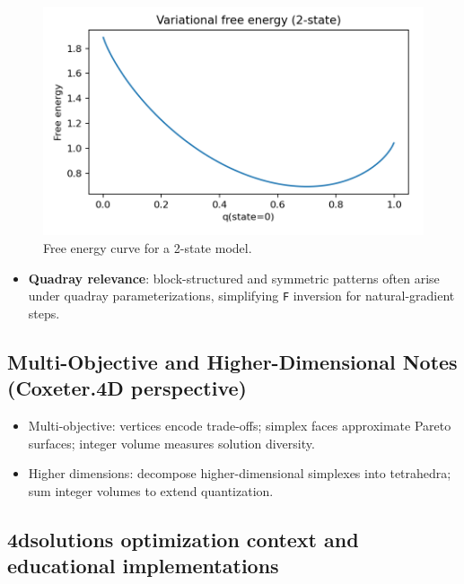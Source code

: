 \documentclass[
]{article}
\providecommand{\tightlist}{%
  \setlength{\itemsep}{0pt}\setlength{\parskip}{0pt}}
\begin{document}
\begin{figure}
\hypertarget{fig:free_energy_curve}{%
\centering
\includegraphics{../output/free_energy_curve.png}
\caption{Free energy curve for a 2-state
model.}\label{fig:free_energy_curve}
}
\end{figure}

\begin{itemize}
\tightlist
\item
  \textbf{Quadray relevance}: block-structured and symmetric patterns
  often arise under quadray parameterizations, simplifying \texttt{F}
  inversion for natural-gradient steps.
\end{itemize}

\hypertarget{multi-objective-and-higher-dimensional-notes-coxeter.4d-perspective}{%
\subsection{Multi-Objective and Higher-Dimensional Notes (Coxeter.4D
perspective)}\label{multi-objective-and-higher-dimensional-notes-coxeter.4d-perspective}}

\begin{itemize}
\tightlist
\item
  Multi-objective: vertices encode trade-offs; simplex faces approximate
  Pareto surfaces; integer volume measures solution diversity.
\item
  Higher dimensions: decompose higher-dimensional simplexes into
  tetrahedra; sum integer volumes to extend quantization.
\end{itemize}

\hypertarget{dsolutions-optimization-context-and-educational-implementations}{%
\subsection{4dsolutions optimization context and educational
implementations}\label{dsolutions-optimization-context-and-educational-implementations}}
\end{document}
